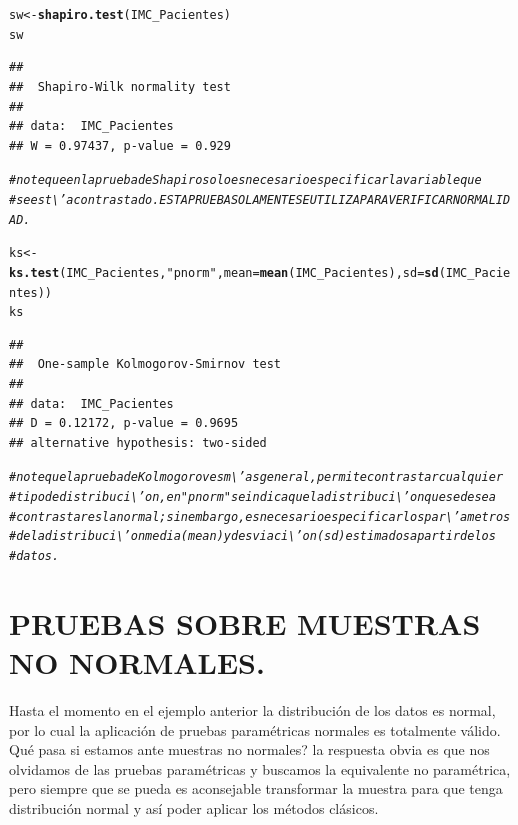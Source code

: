 \documentclass[12pt,letterpaper]{article}\usepackage[]{graphicx}\usepackage[]{color}
\makeatletter
\newcommand{\hlstr}[1]{\textcolor[rgb]{0.192,0.494,0.8}{#1}}%
\newcommand{\hlcom}[1]{\textcolor[rgb]{0.678,0.584,0.686}{\textit{#1}}}%
\newcommand{\hlstd}[1]{\textcolor[rgb]{0.345,0.345,0.345}{#1}}%
\newcommand{\hlkwb}[1]{\textcolor[rgb]{0.69,0.353,0.396}{#1}}%
\newcommand{\hlkwc}[1]{\textcolor[rgb]{0.333,0.667,0.333}{#1}}%
\newcommand{\hlkwd}[1]{\textcolor[rgb]{0.737,0.353,0.396}{\textbf{#1}}}%
\newenvironment{kframe}{%
 \def\at@end@of@kframe{}%
 \ifinner\ifhmode%
  \def\at@end@of@kframe{\end{minipage}}%
  \begin{minipage}{\columnwidth}%
 \fi\fi%
 \def\FrameCommand##1{\hskip\@totalleftmargin \hskip-\fboxsep
 \colorbox{shadecolor}{##1}\hskip-\fboxsep
     \hskip-\linewidth \hskip-\@totalleftmargin \hskip\columnwidth}%
 \MakeFramed {\advance\hsize-\width
   \@totalleftmargin\z@ \linewidth\hsize
   \@setminipage}}%
 {\par\unskip\endMakeFramed%
 \at@end@of@kframe}
\newenvironment{knitrout}{}{} %
\makeatother
\begin{document}
\begin{knitrout}
\begin{kframe}
\begin{alltt}
\hlstd{sw} \hlkwb{<-} \hlkwd{shapiro.test}\hlstd{(IMC_Pacientes)}
\hlstd{sw}
\end{alltt}
\begin{verbatim}
## 
## 	Shapiro-Wilk normality test
## 
## data:  IMC_Pacientes
## W = 0.97437, p-value = 0.929
\end{verbatim}
\begin{alltt}
\hlcom{# note que en la prueba de Shapiro solo es necesario especificar la variable que }
\hlcom{# se est\textbackslash{}'a contrastado. ESTA PRUEBA SOLAMENTE SEUTILIZA PARA VERIFICAR NORMALIDAD. }

\hlstd{ks} \hlkwb{<-} \hlkwd{ks.test}\hlstd{(IMC_Pacientes,}\hlstr{"pnorm"}\hlstd{,}\hlkwc{mean}\hlstd{=}\hlkwd{mean}\hlstd{(IMC_Pacientes),}\hlkwc{sd}\hlstd{=}\hlkwd{sd}\hlstd{(IMC_Pacientes))}
\hlstd{ks}
\end{alltt}
\begin{verbatim}
## 
## 	One-sample Kolmogorov-Smirnov test
## 
## data:  IMC_Pacientes
## D = 0.12172, p-value = 0.9695
## alternative hypothesis: two-sided
\end{verbatim}
\begin{alltt}
\hlcom{# note que la prueba de Kolmogorov es m\textbackslash{}'as general, permite contrastar cualquier }
\hlcom{# tipo de distribuci\textbackslash{}'on, en "pnorm" se indicaque la distribuci\textbackslash{}'on que se desea }
\hlcom{# contrastar es la normal; sin embargo, es necesario especificar los par\textbackslash{}'ametros }
\hlcom{# de la distribuci\textbackslash{}'on media (mean) y desviaci\textbackslash{}'on (sd) estimados a partir de los }
\hlcom{# datos.}
\end{alltt}
\end{kframe}
\end{knitrout}


\section{PRUEBAS SOBRE MUESTRAS NO NORMALES.}


Hasta el momento en el ejemplo anterior la distribuci\'on de los datos es normal, por lo cual la aplicaci\'on de pruebas param\'etricas normales es totalmente v\'alido. \¿Qu\'e pasa si estamos ante muestras no normales? la respuesta obvia es que nos olvidamos de las pruebas param\'etricas y buscamos la equivalente no param\'etrica, pero siempre que se pueda es aconsejable transformar la muestra para que tenga distribuci\'on normal y as\'i poder aplicar los m\'etodos cl\'asicos.\\
\end{document}
